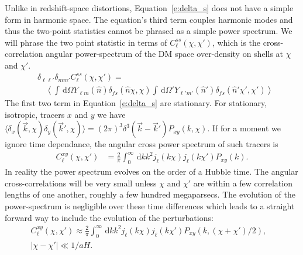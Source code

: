 \documentclass[twocolumn,prl,nofootinbib]{revtex4-1}
\newcommand{\ud}{\,\mathrm{d}}
\begin{document}
Unlike in redshift-space distortions, Equation~\ref{e:delta_s} does not have a
simple form in harmonic space. The equation's third term couples harmonic modes
and thus the two-point statistics cannot be phrased as a simple power spectrum.
We will phrase the two point statistic in terms of $C^{ss}_\ell(\chi,\chi')$, which is
the cross-correlation angular power-spectrum of the DM space over-density
on shells at $\chi$ and $\chi'$.
\begin{align}
    &\delta_{\ell\ell'}\delta_{mm'}C^{ss}_\ell(\chi, \chi') = \nonumber \\
    & \quad
        \left\langle
        \int\ud\Omega Y_{\ell m}(\hat n)
       \delta_{fs}(\hat n \chi, \chi)
        \int\ud\Omega' Y_{\ell' m'}(\hat n')
        \delta_{fs}(\hat n' \chi', \chi')
        \right\rangle
\end{align}
The first two term in Equation~\ref{e:delta_s} are stationary. For stationary,
isotropic, tracers $x$ and $y$ we have 
$\langle \delta_x(\vec k, \chi) \delta_y(\vec k', \chi) \rangle = (2\pi)^3
\delta^3(\vec k - \vec k') P_{xy}(k, \chi)$.  If for a moment we ignore time
dependance, the angular cross power spectrum of such tracers is
\begin{align}
    C^{xy}_\ell(\chi,\chi')
    &= \frac{2}{\pi}
\int_0^\infty\ud k k^2 j_\ell(k\chi) j_{\ell}(k\chi')P_{xy}(k).
\end{align}
In reality the power spectrum evolves on the order of a Hubble time.
The angular cross-correlations will be very small unless $\chi$ and $\chi'$ are
within a few correlation lengths of one another, roughly a few hundred
megaparsecs.  The evolution of the power-spectrum is negligible over these time
differences which leads to a straight forward way to include the evolution of
the perturbations:
\begin{align}
C^{xy}_\ell(\chi,\chi') 
    \approx \frac{2}{\pi}
    \int_0^\infty\ud k k^2
    j_\ell(k\chi) j_{\ell}(k\chi')
    P_{xy}(k,(\chi + \chi')/2),\nonumber &\\
    |\chi - \chi'| \ll 1/aH.&
\end{align}
\end{document}
